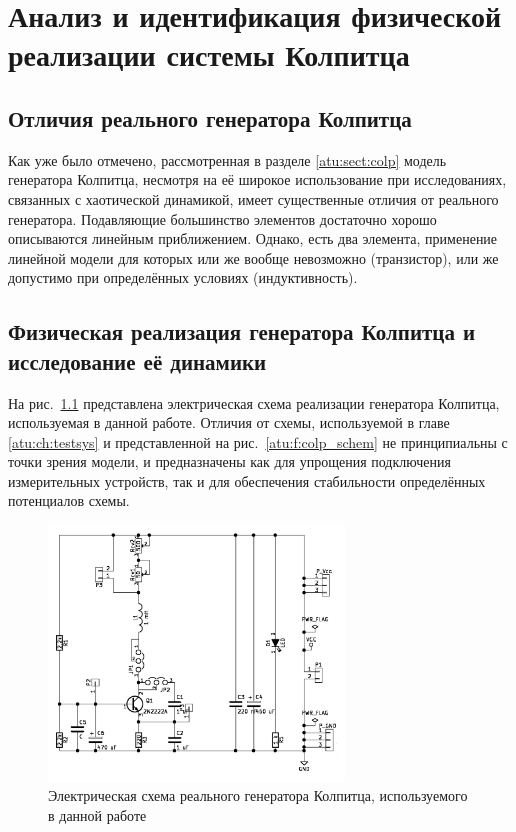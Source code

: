 \chapter{Анализ и идентификация физической реализации системы Колпитца}
\label{atu:ch:colpreal}

\section{Отличия реального генератора Колпитца}


Как уже было отмечено,
рассмотренная в разделе \ref{atu:sect:colp} модель
генератора Колпитца, несмотря на её широкое использование
при исследованиях, связанных с хаотической динамикой,
имеет существенные отличия от реального генератора.
Подавляющие большинство элементов достаточно хорошо описываются линейным
приближением. Однако, есть два элемента,
применение линейной модели для которых или же вообще невозможно (транзистор),
или же допустимо при определённых условиях (индуктивность).





\section{Физическая реализация генератора Колпитца и исследование её динамики}

На рис.~\ref{atu:f:colp_schem_real} представлена электрическая схема
реализации генератора Колпитца, используемая в данной работе.
Отличия от схемы, используемой в главе \ref{atu:ch:testsys}
и представленной на рис.~\ref{atu:f:colp_schem}
не принципиальны с точки зрения модели,
и предназначены как для упрощения подключения
измерительных устройств, так и для
обеспечения стабильности определённых потенциалов схемы.

\begin{figure}[htb!]
\centerline{\includegraphics[width=0.7\textwidth]{p/colp_schem_real.png} }
\caption{Электрическая схема реального генератора Колпитца, используемого в данной работе}
\label{atu:f:colp_schem_real}
\end{figure}

